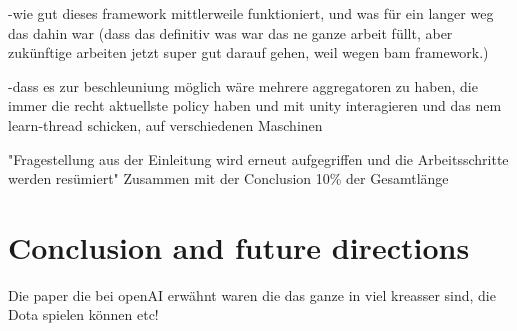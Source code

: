 -wie gut dieses framework mittlerweile funktioniert, und was für ein langer weg das dahin war (dass das definitiv was war das ne ganze arbeit füllt, aber zukünftige arbeiten jetzt super gut darauf gehen, weil wegen bam framework.)

-dass es zur beschleuniung möglich wäre mehrere aggregatoren zu haben, die immer die recht aktuellste policy haben und mit unity interagieren und das nem learn-thread schicken, auf verschiedenen Maschinen

"Fragestellung aus der Einleitung wird erneut aufgegriffen und die Arbeitsschritte
werden resümiert"
Zusammen mit der Conclusion 10\% der Gesamtlänge

\chapter{Conclusion and future directions}

Die paper die bei openAI erwähnt waren die das ganze in viel kreasser sind, die Dota spielen können etc!



